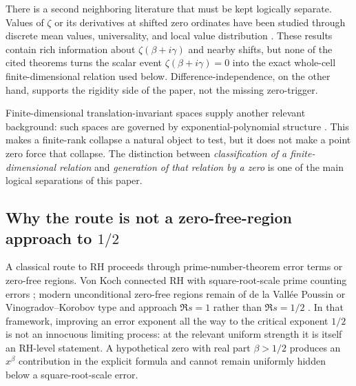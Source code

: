 \documentclass[11pt]{amsart}
\numberwithin{equation}{section}
\begin{document}
There is a second neighboring literature that must be kept logically
separate.  Values of $\zeta$ or its derivatives at shifted zero ordinates have
been studied through discrete mean values, universality, and local value
distribution
\cite{Gonek1984,GarunkstisLaurincikas2018,
GarunkstisLaurincikasMacaitiene2017,Laurincikas2019,Cicek2021,
LaurincikasSiauciunas2020,GarunkstisNovikas2025,GarunkstisPaliulionyte2025}.  These results contain rich
information about $\zeta(\beta+i\gamma)$ and nearby shifts, but none of the
cited theorems turns the scalar event $\zeta(\beta+i\gamma)=0$ into the exact
whole-cell finite-dimensional relation used below.  Difference-independence,
on the other hand, supports the rigidity side of the paper, not the missing
zero-trigger.

Finite-dimensional translation-invariant spaces supply another relevant
background: such spaces are governed by exponential-polynomial structure
\cite{AnseloneKorevaar1964,Engert1970,Szekelyhidi1982}.  This makes a
finite-rank collapse a natural object to test, but it does not make a point
zero force that collapse.  The distinction between \emph{classification of a
finite-dimensional relation} and \emph{generation of that relation by a
zero} is one of the main logical separations of this paper.

\subsection{Why the route is not a zero-free-region approach to \texorpdfstring{$1/2$}{1/2}}
\label{subsec:intro-no-log-barrier}

A classical route to RH proceeds through prime-number-theorem error terms or
zero-free regions.  Von Koch connected RH with square-root-scale prime
counting errors \cite{vonKoch1901}; modern unconditional zero-free regions
remain of de la Vall\'ee Poussin or Vinogradov--Korobov type and approach
$\Re s=1$ rather than $\Re s=1/2$
\cite{Ford2002,MossinghoffTrudgianYang2024}.  In that framework, improving an
error exponent all the way to the critical exponent $1/2$ is not an
innocuous limiting process: at the relevant uniform strength it is itself an
RH-level statement.  A hypothetical zero with real part $\beta>1/2$ produces
an $x^\beta$ contribution in the explicit formula and cannot remain uniformly
hidden below a square-root-scale error.
\end{document}
